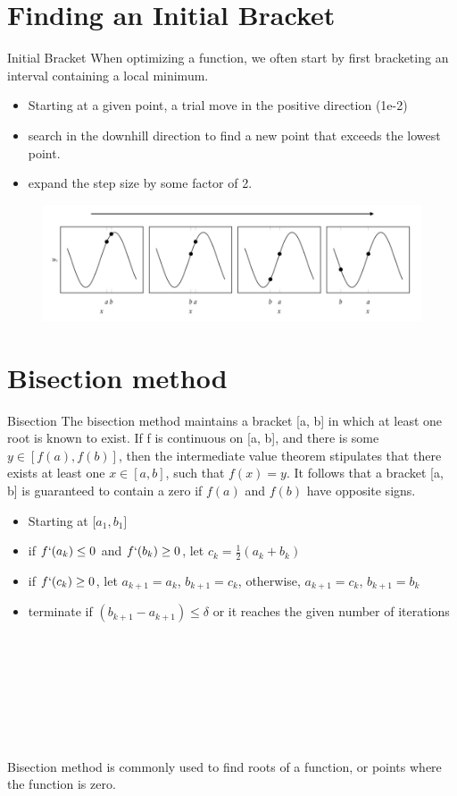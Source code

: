 \documentclass{beamer}
\begin{document}
\section{Finding an Initial Bracket}
\begin{frame}{Initial Bracket}
When optimizing a function, we often start by first bracketing an interval containing a local minimum.
\begin{itemize}
    \item Starting at a given point, a trial move in the positive direction (1e-2) 
    \item search in the downhill direction to find a new point that exceeds the lowest point. 
    \item expand the step size by some factor of 2. 
\end{itemize}
\begin{figure}
\centering
\includegraphics[width=120mm]{Figs/bracket.jpeg}
\end{figure}

\end{frame}


\section{Bisection method}
\begin{frame}{Bisection}
The bisection method maintains a bracket [a, b] in which at least one root is known to exist. If f is continuous on [a, b], and there is some $y \in [ f (a), f (b)]$, then the intermediate value theorem stipulates that there exists at least one $x \in [a, b]$, such that $f(x) = y$. It follows that a bracket [a, b] is guaranteed to contain a zero if $f(a)$ and $f(b)$ have opposite signs.

\begin{itemize}
    \item Starting at [$a_1, b_1]$ 
    \item if $f`(a_k) \leq 0$ and $f`(b_k) \geq 0$, let $c_k = \frac{1}{2} (a_k + b_k)$
    \item if $f`(c_k) \geq 0$, let $a_{k+1} = a_k$, $b_{k+1}=c_k$, otherwise, $a_{k+1}=c_k$, $b_{k+1}=b_k$ 
    \item terminate if $(b_{k+1} - a_{k+1}) \leq \delta $ or it reaches the given number of iterations
\end{itemize}
\\\\\\\\\\\\\\
Bisection method is commonly used to find roots of a function, or points where the function is zero.

\end{frame}
\end{document}
